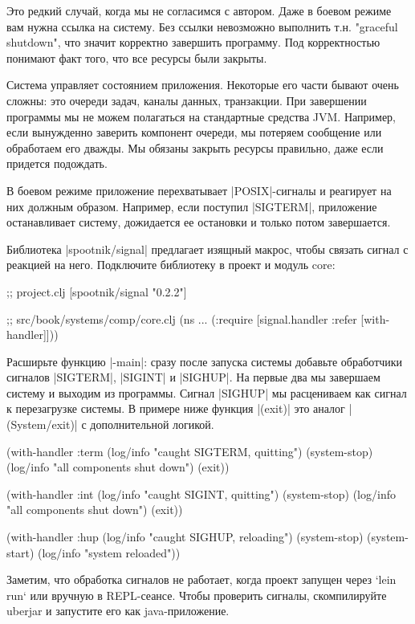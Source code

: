 Это редкий случай, когда мы не согласимся с автором. Даже в боевом режиме вам
нужна ссылка на систему. Без ссылки невозможно выполнить т.н. "graceful
shutdown", что значит корректно завершить программу. Под корректностью понимают
факт того, что все ресурсы были закрыты.

Система управляет состоянием приложения. Некоторые его части бывают очень
сложны: это очереди задач, каналы данных, транзакции. При завершении программы
мы не можем полагаться на стандартные средства JVM. Например, если вынужденно
заверить компонент очереди, мы потеряем сообщение или обработаем его дважды. Мы
обязаны закрыть ресурсы правильно, даже если придется подождать.

В боевом режиме приложение перехватывает \spverb|POSIX|-сигналы и реагирует на них
должным образом. Например, если поступил \spverb|SIGTERM|, приложение останавливает
систему, дожидается ее остановки и только потом завершается.

Библиотека \spverb|spootnik/signal| предлагает изящный макрос, чтобы связать сигнал с
реакцией на него. Подключите библиотеку в проект и модуль core:

\begin{code}
;; project.clj
[spootnik/signal "0.2.2"]

;; src/book/systems/comp/core.clj
(ns ...
  (:require [signal.handler :refer [with-handler]]))
\end{code}

Расширьте функцию \spverb|-main|: сразу после запуска системы добавьте обработчики
сигналов \spverb|SIGTERM|, \spverb|SIGINT| и \spverb|SIGHUP|. На первые два мы завершаем систему и
выходим из программы. Сигнал \spverb|SIGHUP| мы расцениваем как сигнал к перезагрузке
системы. В примере ниже функция \spverb|(exit)| это аналог \spverb|(System/exit)| с
дополнительной логикой.

\begin{code}
(with-handler :term
  (log/info "caught SIGTERM, quitting")
  (system-stop)
  (log/info "all components shut down")
  (exit))

(with-handler :int
  (log/info "caught SIGINT, quitting")
  (system-stop)
  (log/info "all components shut down")
  (exit))

(with-handler :hup
  (log/info "caught SIGHUP, reloading")
  (system-stop)
  (system-start)
  (log/info "system reloaded"))
\end{code}

Заметим, что обработка сигналов не работает, когда проект запущен через `lein
run` или вручную в REPL-сеансе. Чтобы проверить сигналы, скомпилируйте uberjar и
запустите его как java-приложение.


